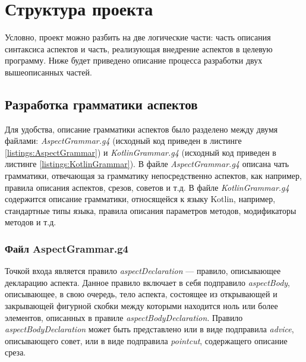 \section{Структура проекта}
\label{sec:project_structure}
Условно, проект можно разбить на две логические части: часть описания
синтаксиса аспектов и часть, реализующая внедрение аспектов в целевую программу.
Ниже будет приведено описание процесса разработки двух вышеописанных частей.
\subsection{Разработка грамматики аспектов}
\label{sub:aspect_grammar_part_development}
Для удобства, описание грамматики аспектов было разделено между двумя файлами:
\textit{AspectGrammar.g4} (исходный код приведен в листинге
\ref{listings:AspectGrammar}) и \textit{KotlinGrammar.g4} (исходный код
приведен в листинге \ref{listings:KotlinGrammar}).
В файле \textit{AspectGrammar.g4} описана чать грамматики, отвечающая за
грамматику непосредственно аспектов, как например, правила описания аспектов,
срезов, советов и т.д.
В файле \textit{KotlinGrammar.g4} содержится описание грамматики, относящейся к
языку Kotlin, например, стандартные типы языка, правила описания параметров
методов, модификаторы методов и т.д.
\subsubsection{Файл AspectGrammar.g4}
\label{ssub:aspect_grammar_g4}
Точкой входа является правило \textit{aspectDeclaration} --- правило,
описывающее декларацию аспекта.
Данное правило включает в себя подправило \textit{aspectBody}, описывающее, в
свою очередь, тело аспекта, состоящее из открывающей и закрывающей фигурной
скобки между которыми находится ноль или более элементов, описанных в правиле
\textit{aspectBodyDeclaration}.
Правило \textit{aspectBodyDeclaration} может быть представлено или в виде
подправила \textit{advice}, описывающего совет, или в виде подправила
\textit{pointcut}, содержащего описание среза.

